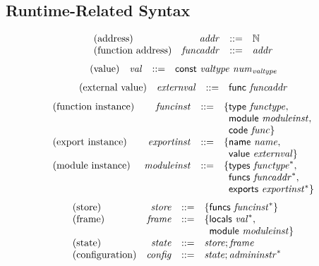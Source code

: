 \documentclass{article}
\begin{document}
\subsection{Runtime-Related Syntax}
$$
\begin{array}{@{}lrrl@{}l@{}}
\mbox{(address)} & {\mathit{addr}} &::=& \mathbb{N} \\
\mbox{(function address)} & {\mathit{funcaddr}} &::=& {\mathit{addr}} \\
\end{array}
$$
$$
\begin{array}{@{}lrrl@{}l@{}}
\mbox{(value)} & {\mathit{val}} &::=& \mathsf{const}~{\mathit{valtype}}~{{\mathit{num}}}_{{\mathit{valtype}}} \\
\end{array}
$$
$$
\begin{array}{@{}lrrl@{}l@{}}
\mbox{(external value)} & {\mathit{externval}} &::=& \mathsf{func}~{\mathit{funcaddr}} \\
\end{array}
$$
$$
\begin{array}{@{}lrrl@{}l@{}}
\mbox{(function instance)} & {\mathit{funcinst}} &::=& \{ \begin{array}[t]{@{}l@{}l@{}}
\mathsf{type}~{\mathit{functype}},\; \\
  \mathsf{module}~{\mathit{moduleinst}},\; \\
  \mathsf{code}~{\mathit{func}} \}\end{array} \\
\mbox{(export instance)} & {\mathit{exportinst}} &::=& \{ \begin{array}[t]{@{}l@{}l@{}}
\mathsf{name}~{\mathit{name}},\; \\
  \mathsf{value}~{\mathit{externval}} \}\end{array} \\
\mbox{(module instance)} & {\mathit{moduleinst}} &::=& \{ \begin{array}[t]{@{}l@{}l@{}}
\mathsf{types}~{{\mathit{functype}}^\ast},\; \\
  \mathsf{funcs}~{{\mathit{funcaddr}}^\ast},\; \\
  \mathsf{exports}~{{\mathit{exportinst}}^\ast} \}\end{array} \\
\end{array}
$$
$$
\begin{array}{@{}lrrl@{}l@{}}
\mbox{(store)} & {\mathit{store}} &::=& \{ \begin{array}[t]{@{}l@{}l@{}}
\mathsf{funcs}~{{\mathit{funcinst}}^\ast} \}\end{array} \\
\mbox{(frame)} & {\mathit{frame}} &::=& \{ \begin{array}[t]{@{}l@{}l@{}}
\mathsf{locals}~{{\mathit{val}}^\ast},\; \\
  \mathsf{module}~{\mathit{moduleinst}} \}\end{array} \\
\mbox{(state)} & {\mathit{state}} &::=& {\mathit{store}} ; {\mathit{frame}} \\
\mbox{(configuration)} & {\mathit{config}} &::=& {\mathit{state}} ; {{\mathit{admininstr}}^\ast} \\
\end{array}
$$
\end{document}
